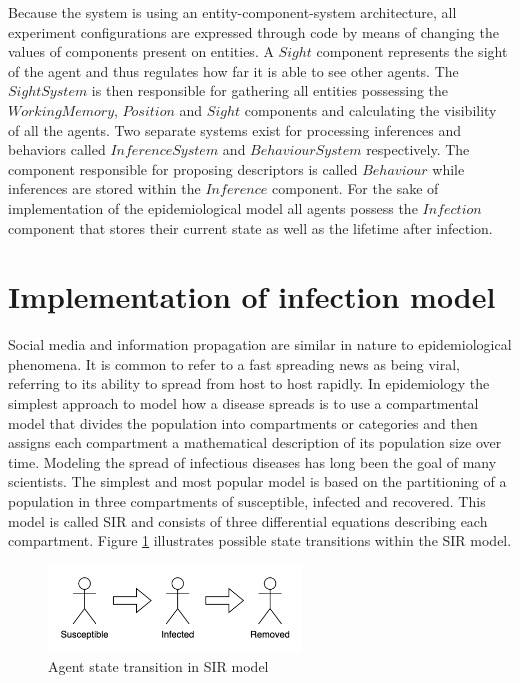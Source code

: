 Because the system is using an entity-component-system architecture, all experiment configurations are expressed through code by means of changing the values of components present on entities.
A $Sight$ component represents the sight of the agent and thus regulates how far it is able to see other agents.
The $SightSystem$ is then responsible for gathering all entities possessing the $WorkingMemory$, $Position$ and $Sight$ components and calculating the visibility of all the agents.
Two separate systems exist for processing inferences and behaviors called $InferenceSystem$ and $BehaviourSystem$ respectively.
The component responsible for proposing descriptors is called $Behaviour$ while inferences are stored within the $Inference$ component.
For the sake of implementation of the epidemiological model all agents possess the $Infection$ component that stores their current state as well as the lifetime after infection.

\section{Implementation of infection model}

Social media and information propagation are similar in nature to epidemiological phenomena.
It is common to refer to a fast spreading news as being viral, referring to its ability to spread from host to host rapidly.
In epidemiology the simplest approach to model how a disease spreads is to use a compartmental model that divides the population into compartments or categories and then assigns each compartment a mathematical description of its population size over time.
Modeling the spread of infectious diseases has long been the goal of many scientists\cite{liu2016}.
The simplest and most popular model is based on the partitioning of a population in three compartments of susceptible, infected and recovered\cite{weiss2013sir}.
This model is called SIR and consists of three differential equations describing each compartment.
Figure \ref{fig:sir.drawio.png} illustrates possible state transitions within the SIR model.

\begin{figure}[H]
    \centering
    \includegraphics[width=0.6\textwidth]{images/chapter2/sir.drawio.png}
    \caption{Agent state transition in SIR model}\label{fig:sir.drawio.png}
\end{figure}

